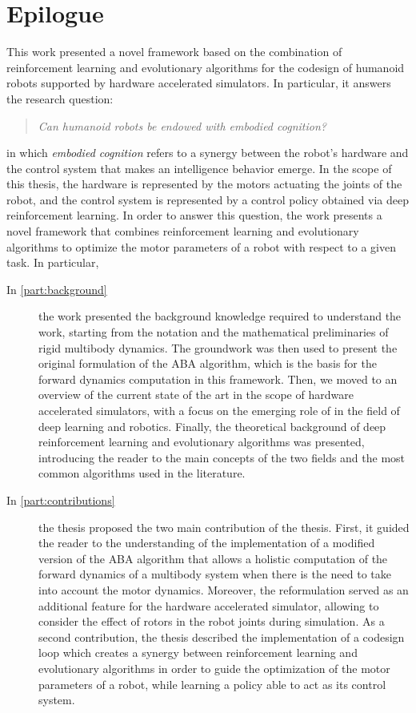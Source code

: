 \chapter*{Epilogue}
\label{chp:99-Epilogue}

This work presented a novel framework based on the combination of reinforcement learning and evolutionary algorithms for the codesign of humanoid robots supported by hardware accelerated simulators. In particular, it answers the research question:

\begin{quote}
    \textit{
        Can humanoid robots be endowed with embodied cognition?}
\end{quote}

in which \textit{embodied cognition} refers to a synergy between the robot's hardware and the control system that makes an intelligence behavior emerge. In the scope of this thesis, the hardware is represented by the motors actuating the joints of the robot, and the control system is represented by a control policy obtained via deep reinforcement learning.
In order to answer this question, the work presents a novel framework that combines reinforcement learning and evolutionary algorithms to optimize the motor parameters of a robot with respect to a given task. In particular,

\begin{description}
    \item[In \cref{part:background}] the work presented the background knowledge required to understand the work, starting from the notation and the mathematical preliminaries of rigid multibody dynamics. The groundwork was then used to present the original formulation of the \ac{ABA} algorithm, which is the basis for the forward dynamics computation in this framework. Then, we moved to an overview of the current state of the art in the scope of hardware accelerated simulators, with a focus on the emerging role of \jax in the field of deep learning and robotics. Finally, the theoretical background of deep reinforcement learning and evolutionary algorithms was presented, introducing the reader to the main concepts of the two fields and the most common algorithms used in the literature.
    \item[In \cref{part:contributions}] the thesis proposed the two main contribution of the thesis. First, it guided the reader to the understanding of the implementation of a modified version of the \ac{ABA} algorithm that allows a holistic computation of the forward dynamics of a multibody system when there is the need to take into account the motor dynamics. Moreover, the reformulation served as an additional feature for the hardware accelerated \jaxsim simulator, allowing to consider the effect of rotors in the robot joints during simulation. As a second contribution, the thesis described the implementation of a codesign loop which creates a synergy between reinforcement learning and evolutionary algorithms in order to guide the optimization of the motor parameters of a robot, while learning a policy able to act as its control system.
\end{description}

